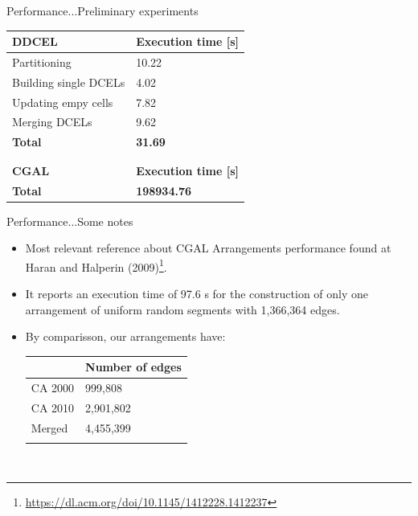 \documentclass{beamer}
\begin{document}
\begin{frame}{Performance...}{Preliminary experiments }
    \centering
    \begin{tabular}{ll}
        \hline
        \textbf{DDCEL} & \textbf{Execution time [s]} \\
        \hline
        Partitioning & 10.22 \\
        Building single DCELs & 4.02 \\
        Updating empy cells & 7.82 \\
        Merging DCELs & 9.62 \\
        \textbf{Total} & \textbf{31.69} \\
        \hline \\
        & \\
        \hline
        \textbf{CGAL} & \textbf{Execution time [s]} \\
        \textbf{Total} & \textbf{198934.76} \\
        \hline
    \end{tabular} 
\end{frame}

\begin{frame}{Performance...}{Some notes }
    \begin{itemize}
        \item Most relevant reference about CGAL Arrangements performance found at Haran and Halperin (2009)\footnote{\url{https://dl.acm.org/doi/10.1145/1412228.1412237}}.
        \item It reports an execution time of 97.6 s for the construction of only one arrangement of uniform random segments with 1,366,364 edges.
        \item By comparisson, our arrangements have: \\
        \begin{tabular}{ll}
            \hline
             & \textbf{Number of edges} \\
            \hline
            CA 2000 & 999,808 \\
            CA 2010 & 2,901,802 \\
            Merged  & 4,455,399 \\
            \hline \\
        \end{tabular} 
    \   \end{itemize}
\end{frame}
\end{document}
